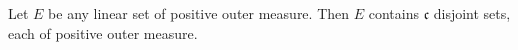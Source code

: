Let $E$ be any linear set of positive outer measure. Then $E$ contains $\mathfrak{c}$ disjoint sets, each of positive outer measure.
